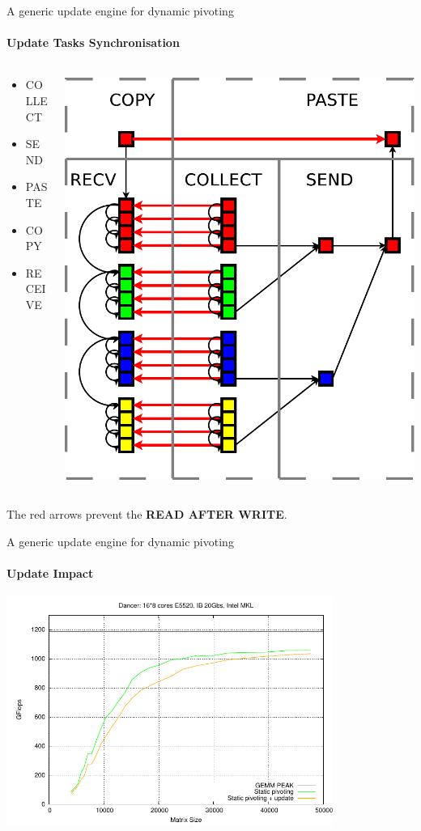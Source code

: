 \begin{frame}{A generic update engine for dynamic pivoting}
\framesubtitle{Update Tasks Synchronisation}
\begin{columns}
\begin{column}{.60\textwidth}
\begin{itemize}
\item COLLECT
\item SEND
\item PASTE
\item COPY
\item RECEIVE
\end{itemize}
\end{column}
\hfill
\begin{column}{.40\textwidth}
\begin{center}
\includegraphics[scale=0.3]{swap_opt.pdf}
\end{center}
\end{column}
\end{columns}
The red arrows prevent the \alert{\textbf{READ AFTER WRITE}}.
\end{frame}

\begin{frame}{A generic update engine for dynamic pivoting}
\framesubtitle{Update Impact}
\begin{center}
\includegraphics[width=0.8\textwidth]{dgetrf_update_problem.pdf} 
\end{center}
\end{frame}
